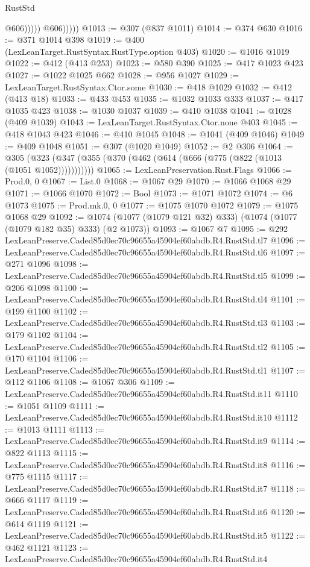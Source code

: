 \begin{lexlean}{RustStd}
\begin{coremodule}
                        @606)))))
              @606)))))
@1013 := @307 (@837 @1011)
@1014 := @374 @630
@1016 := @371 @1014 @398
@1019 := @400 (LexLeanTarget.RustSyntax.RustType.option @403)
@1020 := @1016 @1019
@1022 := @412 (@413 @253)
@1023 := @580 @390
@1025 := @417 @1023 @423
@1027 := @1022 @1025 @662
@1028 := @956 @1027
@1029 := LexLeanTarget.RustSyntax.Ctor.some
@1030 := @418 @1029
@1032 := @412 (@413 @18)
@1033 := @433 @453
@1035 := @1032 @1033 @333
@1037 := @417 @1035 @423
@1038 := @1030 @1037
@1039 := @410 @1038
@1041 := @1028 (@409 @1039)
@1043 := LexLeanTarget.RustSyntax.Ctor.none @403
@1045 := @418 @1043 @423
@1046 := @410 @1045
@1048 := @1041 (@409 @1046)
@1049 := @409 @1048
@1051 := @307 (@1020 @1049)
@1052 := @2 @306
@1064 := @305 (@323 (@347 (@355 (@370 (@462 (@614 (@666 (@775 (@822 (@1013 (@1051 @1052)))))))))))
@1065 := LexLeanPreservation.Rust.Flags
@1066 := Prod.{0, 0}
@1067 := List.{0}
@1068 := @1067 @29
@1070 := @1066 @1068 @29
@1071 := @1066 @1070
@1072 := Bool
@1073 := @1071 @1072
@1074 := @6 @1073
@1075 := Prod.mk.{0, 0}
@1077 := @1075 @1070 @1072
@1079 := @1075 @1068 @29
@1092 := @1074 (@1077 (@1079 @121 @32) @333) (@1074 (@1077 (@1079 @182 @35) @333) (@2 @1073))
@1093 := @1067 @7
@1095 := @292 LexLeanPreserve.Caded85d0ec70c96655a45904ef60abdb.R4.RustStd.tl7
@1096 := LexLeanPreserve.Caded85d0ec70c96655a45904ef60abdb.R4.RustStd.tl6
@1097 := @271 @1096
@1098 := LexLeanPreserve.Caded85d0ec70c96655a45904ef60abdb.R4.RustStd.tl5
@1099 := @206 @1098
@1100 := LexLeanPreserve.Caded85d0ec70c96655a45904ef60abdb.R4.RustStd.tl4
@1101 := @199 @1100
@1102 := LexLeanPreserve.Caded85d0ec70c96655a45904ef60abdb.R4.RustStd.tl3
@1103 := @179 @1102
@1104 := LexLeanPreserve.Caded85d0ec70c96655a45904ef60abdb.R4.RustStd.tl2
@1105 := @170 @1104
@1106 := LexLeanPreserve.Caded85d0ec70c96655a45904ef60abdb.R4.RustStd.tl1
@1107 := @112 @1106
@1108 := @1067 @306
@1109 := LexLeanPreserve.Caded85d0ec70c96655a45904ef60abdb.R4.RustStd.it11
@1110 := @1051 @1109
@1111 := LexLeanPreserve.Caded85d0ec70c96655a45904ef60abdb.R4.RustStd.it10
@1112 := @1013 @1111
@1113 := LexLeanPreserve.Caded85d0ec70c96655a45904ef60abdb.R4.RustStd.it9
@1114 := @822 @1113
@1115 := LexLeanPreserve.Caded85d0ec70c96655a45904ef60abdb.R4.RustStd.it8
@1116 := @775 @1115
@1117 := LexLeanPreserve.Caded85d0ec70c96655a45904ef60abdb.R4.RustStd.it7
@1118 := @666 @1117
@1119 := LexLeanPreserve.Caded85d0ec70c96655a45904ef60abdb.R4.RustStd.it6
@1120 := @614 @1119
@1121 := LexLeanPreserve.Caded85d0ec70c96655a45904ef60abdb.R4.RustStd.it5
@1122 := @462 @1121
@1123 := LexLeanPreserve.Caded85d0ec70c96655a45904ef60abdb.R4.RustStd.it4

\end{coremodule}
\end{lexlean}
